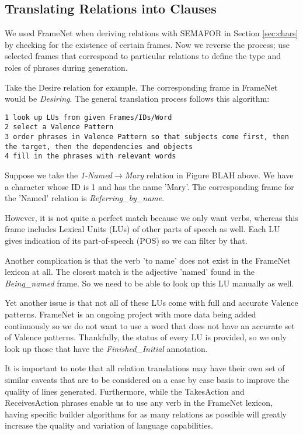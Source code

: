 \subsection{Translating Relations into Clauses}
We used FrameNet when deriving relations with SEMAFOR in Section \ref{sec:chars} by checking for the existence of certain frames. Now we reverse the process; use selected frames that correspond to particular relations to define the type and roles of phrases during generation.

Take the Desire relation for example. The corresponding frame in FrameNet would be \textit{Desiring}. The general translation process follows this algorithm:

\begin{verbatim}
1 look up LUs from given Frames/IDs/Word
2 select a Valence Pattern
3 order phrases in Valence Pattern so that subjects come first, then the target, then the dependencies and objects
4 fill in the phrases with relevant words
\end{verbatim}

Suppose we take the \textit{1-Named$\rightarrow$Mary} relation in Figure BLAH above. We have a character whose ID is 1 and has the name 'Mary'. The corresponding frame for the 'Named' relation is \textit{Referring\_by\_name}. 

However, it is not quite a perfect match because we only want verbs, whereas this frame includes Lexical Units (LUs) of other parts of speech as well. Each LU gives indication of its part-of-speech (POS) so we can filter by that. 

Another complication is that the verb 'to name' does not exist in the FrameNet lexicon at all. The closest match is the adjective 'named' found in the \textit{Being\_named} frame. So we need to be able to look up this LU manually as well.

Yet another issue is that not all of these LUs come with full and accurate Valence patterns. FrameNet is an ongoing project with more data being added continuously so we do not want to use a word that does not have an accurate set of Valence patterns. Thankfully, the status of every LU is provided, so we only look up those that have the \textit{Finished\_Initial} annotation.

It is important to note that all relation translations may have their own set of similar caveats that are to be considered on a case by case basis to improve the quality of lines generated. Furthermore, while the TakesAction and ReceivesAction phrases enable us to use any verb in the FrameNet lexicon, having specific builder algorithms for as many relations as possible will greatly increase the quality and variation of language capabilities.

